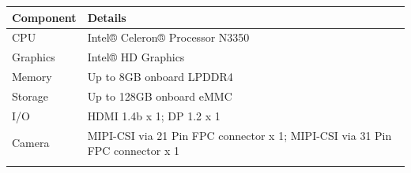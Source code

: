\begin{longtable}[]{@{}ll@{}}
\toprule
\begin{minipage}[b]{0.29\columnwidth}\raggedright
Component\strut
\end{minipage} & \begin{minipage}[b]{0.65\columnwidth}\raggedright
Details\strut
\end{minipage}\tabularnewline
\midrule
\endhead
\begin{minipage}[t]{0.29\columnwidth}\raggedright
CPU\strut
\end{minipage} & \begin{minipage}[t]{0.65\columnwidth}\raggedright
Intel® Celeron® Processor N3350\strut
\end{minipage}\tabularnewline
\begin{minipage}[t]{0.29\columnwidth}\raggedright
Graphics\strut
\end{minipage} & \begin{minipage}[t]{0.65\columnwidth}\raggedright
Intel® HD Graphics\strut
\end{minipage}\tabularnewline
\begin{minipage}[t]{0.29\columnwidth}\raggedright
Memory\strut
\end{minipage} & \begin{minipage}[t]{0.65\columnwidth}\raggedright
Up to 8GB onboard LPDDR4\strut
\end{minipage}\tabularnewline
\begin{minipage}[t]{0.29\columnwidth}\raggedright
Storage\strut
\end{minipage} & \begin{minipage}[t]{0.65\columnwidth}\raggedright
Up to 128GB onboard eMMC\strut
\end{minipage}\tabularnewline
\begin{minipage}[t]{0.29\columnwidth}\raggedright
I/O\strut
\end{minipage} & \begin{minipage}[t]{0.65\columnwidth}\raggedright
HDMI 1.4b x 1; DP 1.2 x 1\strut
\end{minipage}\tabularnewline
\begin{minipage}[t]{0.29\columnwidth}\raggedright
Camera\strut
\end{minipage} & \begin{minipage}[t]{0.65\columnwidth}\raggedright
MIPI-CSI via 21 Pin FPC connector x 1; MIPI-CSI via 31 Pin FPC connector
x 1\strut
\end{minipage}\tabularnewline
\begin{minipage}[t]{0.29\columnwidth}\raggedright

\end{minipage}
\end{longtable}

